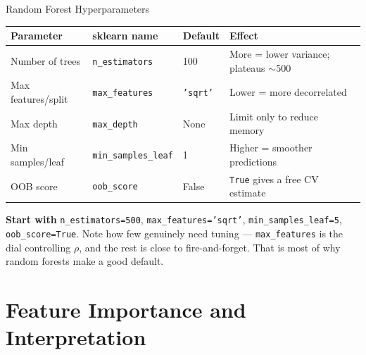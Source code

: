 \documentclass[aspectratio=169, 11pt]{beamer}
\begin{document}
\begin{frame}{Random Forest Hyperparameters}
  \begin{center}
    {\footnotesize
    \begin{tabular}{p{3.0cm}p{2.8cm}p{1.8cm}p{4.0cm}}
      \toprule
      \textbf{Parameter} & \textbf{sklearn name} & \textbf{Default} & \textbf{Effect} \\
      \midrule
      Number of trees & \texttt{n\_estimators} & 100 & More = lower variance; plateaus $\sim$500 \\
      Max features/split & \texttt{max\_features} & \texttt{'sqrt'} & Lower = more decorrelated \\
      Max depth & \texttt{max\_depth} & None & Limit only to reduce memory \\
      Min samples/leaf & \texttt{min\_samples\_leaf} & 1 & Higher = smoother predictions \\
      OOB score & \texttt{oob\_score} & False & \texttt{True} gives a free CV estimate \\
      \bottomrule
    \end{tabular}
    }
  \end{center}

  \textbf{Start with} \texttt{n\_estimators=500}, \texttt{max\_features='sqrt'},
  \texttt{min\_samples\_leaf=5}, \texttt{oob\_score=True}. Note how few genuinely need
  tuning --- \texttt{max\_features} is the dial controlling $\rho$, and the rest is close to
  fire-and-forget. That is most of why random forests make a good default.

\end{frame}

\section{Feature Importance and Interpretation}

\end{document}
